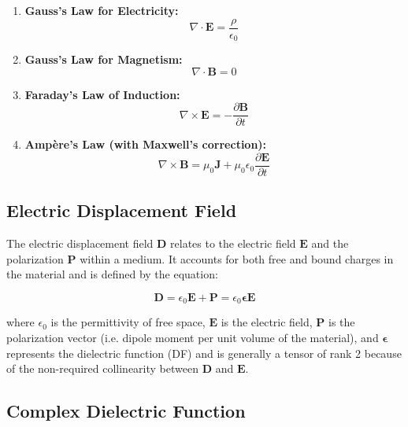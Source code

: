 \begin{enumerate}
    \item \textbf{Gauss's Law for Electricity:}
    \begin{equation}
    \nabla \cdot \mathbf{E} = \frac{\rho}{\epsilon_0}
    \end{equation}

    \item \textbf{Gauss's Law for Magnetism:}
    \begin{equation}
    \nabla \cdot \mathbf{B} = 0
    \end{equation}

    \item \textbf{Faraday's Law of Induction:}
    \begin{equation}
    \nabla \times \mathbf{E} = -\frac{\partial \mathbf{B}}{\partial t}
    \end{equation}

    \item \textbf{Ampère's Law (with Maxwell's correction):}
    \begin{equation}
    \nabla \times \mathbf{B} = \mu_0 \mathbf{J} + \mu_0 \epsilon_0 \frac{\partial \mathbf{E}}{\partial t}
    \end{equation}
\end{enumerate}

\subsection{Electric Displacement Field}


The electric displacement field \( \mathbf{D} \) relates to the electric field \( \mathbf{E} \) and the polarization \( \mathbf{P} \) within a medium. It accounts for both free and bound charges in the material and is defined by the equation:

\[
	\mathbf{D} = \epsilon_0 \mathbf{E} + \mathbf{P} = \epsilon_0 \boldsymbol{\epsilon} \mathbf{E}
\]

where \( \epsilon_0 \) is the permittivity of free space, \( \mathbf{E} \) is the electric field, \( \mathbf{P} \) is the polarization vector (i.e. dipole moment per unit volume of the material), and \( \boldsymbol{\epsilon} \) represents the dielectric function (DF) %
and is generally a tensor of rank 2 because of the non-required collinearity between \( \mathbf{D} \) and \( \mathbf{E} \). %



\subsection{Complex Dielectric Function}


